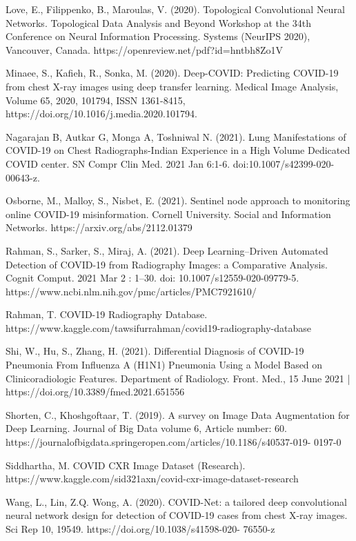 \documentclass[12pt, twocolumn]{CUP-JNL-PPS}
\begin{document}
\medskip
\noindent
[10]    Love, E., Filippenko, B., Maroulas, V. (2020). Topological Convolutional Neural Networks. Topological Data Analysis and Beyond Workshop at the
34th Conference on Neural Information Processing. Systems (NeurIPS 2020),
Vancouver, Canada. https://openreview.net/pdf?id=hntbh8Zo1V

\medskip
\noindent
[11]    Minaee, S., Kafieh, R., Sonka, M. (2020). Deep-COVID: Predicting COVID-19 from chest X-ray images using deep transfer learning.
Medical Image Analysis, Volume 65, 2020, 101794, ISSN 1361-8415,
https://doi.org/10.1016/j.media.2020.101794.

\medskip
\noindent
[12]    Nagarajan B, Autkar G, Monga A, Toshniwal N. (2021). Lung Manifestations of COVID-19 on Chest Radiographs-Indian Experience in a HighVolume Dedicated COVID center. SN Compr Clin Med. 2021 Jan 6:1-6. doi:10.1007/s42399-020-00643-z.

\medskip
\noindent
[13]    Osborne, M., Malloy, S., Nisbet, E. (2021). Sentinel node approach to
monitoring online COVID-19 misinformation. Cornell University. Social and
Information Networks. https://arxiv.org/abs/2112.01379

\medskip
\noindent
[14]    Rahman, S., Sarker, S., Miraj, A. (2021). Deep Learning–Driven Automated
Detection of COVID-19 from Radiography Images: a Comparative Analysis.
Cognit Comput. 2021 Mar 2 : 1–30. doi: 10.1007/s12559-020-09779-5.
https://www.ncbi.nlm.nih.gov/pmc/articles/PMC7921610/ 

\medskip
\noindent
[15]    Rahman, T. COVID-19 Radiography Database.
https://www.kaggle.com/tawsifurrahman/covid19-radiography-database

\medskip
\noindent
[16]    Shi, W., Hu, S., Zhang, H. (2021). Differential Diagnosis of COVID-19
Pneumonia From Influenza A (H1N1) Pneumonia Using a Model Based on
Clinicoradiologic Features. Department of Radiology. Front. Med., 15 June
2021 | https://doi.org/10.3389/fmed.2021.651556

\medskip
\noindent
[17]    Shorten, C., Khoshgoftaar, T. (2019). A survey on Image Data Augmentation for Deep Learning. Journal of Big Data volume 6, Article number:
60. https://journalofbigdata.springeropen.com/articles/10.1186/s40537-019-
0197-0

\medskip
\noindent
[18]    Siddhartha, M. COVID CXR Image Dataset (Research).
https://www.kaggle.com/sid321axn/covid-cxr-image-dataset-research

\medskip
\noindent
[19]    Wang, L., Lin, Z.Q. Wong, A. (2020). COVID-Net: a tailored deep convolutional neural network design for detection of COVID-19 cases from
chest X-ray images. Sci Rep 10, 19549. https://doi.org/10.1038/s41598-020-
76550-z
\end{document}
